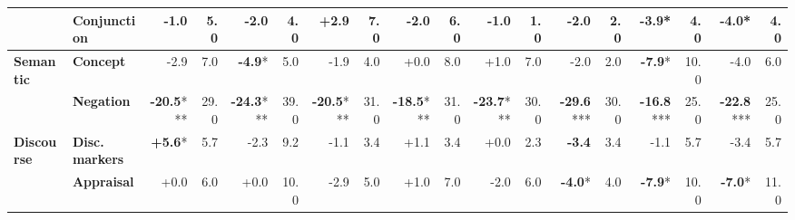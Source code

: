 \begin{table}[h]
{\begin{tabular}{llrrrrrrrrrrrrrrrr}
  & \textbf{Conjunction} & \cellcolor{red!1} -1.0 & \cellcolor{blue!13} 5.0 & \cellcolor{red!3} -2.0 & \cellcolor{blue!10} 4.0 & \cellcolor{green!5} +2.9 & \cellcolor{blue!18} 7.0 & \cellcolor{red!3} -2.0 & \cellcolor{blue!15} 6.0 & \cellcolor{red!1} -1.0 & \cellcolor{blue!3} 1.0 & \cellcolor{red!3} -2.0 & \cellcolor{blue!5} 2.0 & \cellcolor{red!7} \textbf{-3.9}* & \cellcolor{blue!10} 4.0 & \cellcolor{red!7} \textbf{-4.0}* & \cellcolor{blue!10} 4.0 \\
\midrule
\textbf{Semantic} & \textbf{Concept} & \cellcolor{red!5} -2.9 & \cellcolor{blue!18} 7.0 & \cellcolor{red!9} \textbf{-4.9}* & \cellcolor{blue!13} 5.0 & \cellcolor{red!3} -1.9 & \cellcolor{blue!10} 4.0 & \cellcolor{red!0} +0.0 & \cellcolor{blue!21} 8.0 & \cellcolor{green!1} +1.0 & \cellcolor{blue!18} 7.0 & \cellcolor{red!3} -2.0 & \cellcolor{blue!5} 2.0 & \cellcolor{red!15} \textbf{-7.9}* & \cellcolor{blue!26} 10.0 & \cellcolor{red!7} -4.0 & \cellcolor{blue!15} 6.0 \\
  & \textbf{Negation} & \cellcolor{red!20} \textbf{-20.5}*** & \cellcolor{blue!75} 29.0 & \cellcolor{red!20} \textbf{-24.3}*** & \cellcolor{blue!80} 39.0 & \cellcolor{red!20} \textbf{-20.5}*** & \cellcolor{blue!80} 31.0 & \cellcolor{red!20} \textbf{-18.5}*** & \cellcolor{blue!80} 31.0 & \cellcolor{red!20} \textbf{-23.7}*** & \cellcolor{blue!77} 30.0 & \cellcolor{red!20} \textbf{-29.6}*** & \cellcolor{blue!77} 30.0 & \cellcolor{red!20} \textbf{-16.8}*** & \cellcolor{blue!65} 25.0 & \cellcolor{red!20} \textbf{-22.8}*** & \cellcolor{blue!65} 25.0 \\
\midrule
\textbf{Discourse} & \textbf{Disc. markers} & \cellcolor{green!11} \textbf{+5.6}* & \cellcolor{blue!15} 5.7 & \cellcolor{red!4} -2.3 & \cellcolor{blue!24} 9.2 & \cellcolor{red!2} -1.1 & \cellcolor{blue!9} 3.4 & \cellcolor{green!2} +1.1 & \cellcolor{blue!9} 3.4 & \cellcolor{red!0} +0.0 & \cellcolor{blue!6} 2.3 & \cellcolor{red!6} \textbf{-3.4} & \cellcolor{blue!9} 3.4 & \cellcolor{red!2} -1.1 & \cellcolor{blue!15} 5.7 & \cellcolor{red!6} -3.4 & \cellcolor{blue!15} 5.7 \\
  & \textbf{Appraisal} & \cellcolor{red!0} +0.0 & \cellcolor{blue!15} 6.0 & \cellcolor{red!0} +0.0 & \cellcolor{blue!26} 10.0 & \cellcolor{red!5} -2.9 & \cellcolor{blue!13} 5.0 & \cellcolor{green!1} +1.0 & \cellcolor{blue!18} 7.0 & \cellcolor{red!3} -2.0 & \cellcolor{blue!15} 6.0 & \cellcolor{red!7} \textbf{-4.0}* & \cellcolor{blue!10} 4.0 & \cellcolor{red!15} \textbf{-7.9}* & \cellcolor{blue!26} 10.0 & \cellcolor{red!13} \textbf{-7.0}* & \cellcolor{blue!28} 11.0 \\

\end{tabular}}
\end{table}
